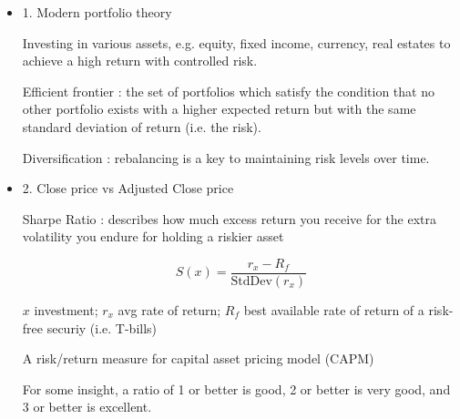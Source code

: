 \documentclass{article}
\begin{document}
\newpage
{}
\begin{itemize}
\item 1. Modern portfolio theory

	Investing in various assets, e.g. equity, fixed income, currency, real estates to achieve a high return with controlled risk.

	{\color{red} Efficient frontier} : the set of portfolios which satisfy the condition that no other portfolio exists with a higher expected return but with the same standard deviation of return (i.e. the risk).

	Diversification : rebalancing is a key to maintaining risk levels over time.

\item 2. Close price vs Adjusted Close price

	{\color{red} Sharpe Ratio} : describes how much excess return you receive for the extra volatility you endure for holding a riskier asset

	$$S(x) = \frac{r_x - R_f}{\text{StdDev}(r_x)}$$

	$x$ investment; $r_x$ avg rate of return; $R_f$ best available rate of return of a risk-free securiy (i.e. T-bills)

	A risk/return measure for capital asset pricing model (CAPM)

	For some insight, a ratio of 1 or better is good, 2 or better is very good, and 3 or better is excellent.
\end{itemize}
\end{document}
